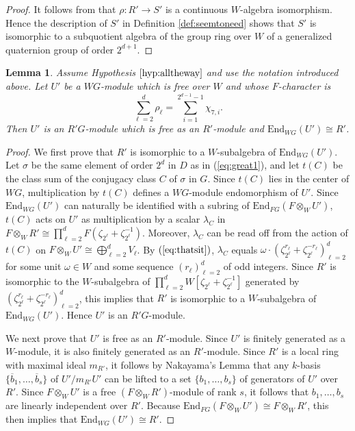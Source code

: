 \documentclass{amsart}
\theoremstyle{plain}
\newtheorem{lemma}[thm]{Lemma}
\theoremstyle{definition}
\theoremstyle{remark}
\begin{document}
\begin{proof}
It follows from \cite[Lemma 2.3.6]{3sim} that $\rho:R'\to S'$ is a continuous $W$-algebra isomorphism.
Hence the description of $S'$ in Definition \ref{def:seemtoneed} shows that $S'$ is isomorphic to a
subquotient algebra of the group ring over $W$ of a generalized quaternion group of order $2^{d+1}$.
\end{proof}

\begin{lemma}
\label{lem:quaternionargument}
Assume Hypothesis $\ref{hyp:alltheway}$ and use the notation introduced above.
Let $U'$ be a $WG$-module which is free over $W$ and whose $F$-character is
$$\sum_{\ell=2}^d \rho_\ell = \sum_{i=1}^{2^{d-1}-1}\chi_{7,i}.$$
Then $U'$ is an $R'G$-module which is free as an $R'$-module and $\mathrm{End}_{WG}(U')
\cong R'$.
\end{lemma}

\begin{proof}
We first prove that $R'$ is isomorphic to a $W$-subalgebra of 
$\mathrm{End}_{WG}(U')$. Let $\sigma$ be the same element of order $2^d$ in $D$ as in 
(\ref{eq:great1}), and let $t(C)$ be the 
class sum of the conjugacy class $C$ of $\sigma$ in $G$. Since $t(C)$ lies in the center of $WG$, 
multiplication by $t(C)$ defines a $WG$-module endomorphism of $U'$. Since 
$\mathrm{End}_{WG}(U')$ can naturally be identified with a subring of 
$\mathrm{End}_{FG}(F\otimes_W U')$, $t(C)$ acts on $U'$ as multiplication by a scalar $\lambda_C$ in 
$F\otimes_W R'\cong\prod_{\ell=2}^dF(\zeta_{2^\ell}+\zeta_{2^\ell}^{-1})$. Moreover, $\lambda_C$ 
can be read off from the action of $t(C)$ on $F\otimes_W U'\cong\bigoplus_{\ell=2}^dV_\ell$.
By $(\ref{eq:thatsit})$, $\lambda_C$ equals
$\omega\cdot (\zeta_{2^\ell}^{r_\ell}+\zeta_{2^\ell}^{-r_{\ell}})_{\ell=2}^d$
for some unit $\omega\in W$ and some sequence $(r_\ell)_{\ell=2}^d$ of odd integers.
Since $R'$ is isomorphic to the 
$W$-subalgebra of $\prod_{\ell=2}^d W[\zeta_{2^\ell}+\zeta_{2^\ell}^{-1}]$ generated by 
$(\zeta_{2^\ell}^{r_\ell}+\zeta_{2^\ell}^{-r_{\ell}})_{\ell=2}^{d}$,
this implies that $R'$ is isomorphic to a $W$-subalgebra of 
$\mathrm{End}_{WG}(U')$.
Hence $U'$ is an $R'G$-module. 

We next prove that $U'$ is free as an 
$R'$-module. Since $U'$ is finitely generated as a $W$-module, it is also finitely generated as an 
$R'$-module. Since $R'$ is a local ring with maximal ideal $m_{R'}$, it follows by Nakayama's Lemma that any $k$-basis $\{\overline{b}_1,\ldots, \overline{b}_s\}$ of $U'/m_{R'}U'$ can be lifted to a set 
$\{b_1,\ldots, b_s\}$ of generators of $U'$ over $R'$. Since $F\otimes_W U'$ is a free 
$(F\otimes_W R')$-module of rank $s$, it follows that $b_1,\ldots, b_s$ are linearly independent over 
$R'$. Because $\mathrm{End}_{FG}(F\otimes_W U')\cong F\otimes_WR'$, this then implies that 
$\mathrm{End}_{WG}(U')\cong R'$. 
\end{proof}
\end{document}
